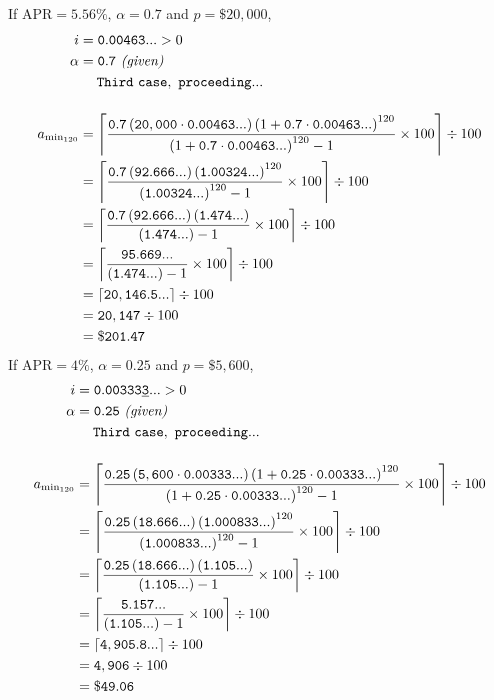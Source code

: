 \documentclass[12pt,letterpaper,oneside]{article}
\theoremstyle{remark} %
\begin{document}
	\newpage
	\renewcommand{\base}{\left(1+\mathtt{0.7}\cdot\mathtt{0.00463...}\right)}
	If $\mbox{APR}=5.56\%$, $\alpha=0.7$ and $p=\$20,000$,
	\begin{align*}
	i&=\mathtt{0.00463...}>0\\
	\alpha&=\mathtt{0.7}\ \textit{(given)}\\
	&\quad\;\mathtt{Third\ case,\ proceeding...}\\[12pt]
	a_{\rm{min_{120}}}&=\left\lceil{\frac{\mathtt{0.7}\left(\mathtt{20,000}\cdot\mathtt{0.00463...}\right)\base^{120}}{\base^{120}-1}\times 100}\right\rceil\div 100\\
	&=\left\lceil{\frac{\mathtt{0.7}\left(\mathtt{92.666...}\right)\left(\mathtt{1.00324...}\right)^{120}}{\left(\mathtt{1.00324...}\right)^{120}-1}\times 100}\right\rceil\div 100\\
	&=\left\lceil{\frac{\mathtt{0.7}\left(\mathtt{92.666...}\right)\left(\mathtt{1.474...}\right)}{\left(\mathtt{1.474...}\right)-1}\times 100}\right\rceil\div 100\\
	&=\left\lceil{\frac{\mathtt{95.669...}}{\left(\mathtt{1.474...}\right)-1}\times 100}\right\rceil\div 100\\
	&=\left\lceil{\mathtt{20,146.5...}}\right\rceil\div 100\\
	&=\mathtt{20,147}\div 100\\
	&=\mathtt{\$201.47}
	\end{align*}
	\renewcommand{\base}{\left(1+\mathtt{0.25}\cdot\mathtt{0.00333...}\right)}
	If $\mbox{APR}=4\%$, $\alpha=0.25$ and $p=\$5,600$,
	\begin{align*}
	i&=\mathtt{0.00333\underline{3}...}>0\\
	\alpha&=\mathtt{0.25}\ \textit{(given)}\\
	&\quad\;\mathtt{Third\ case,\ proceeding...}\\[12pt]
	a_{\rm{min_{120}}}&=\left\lceil{\frac{\mathtt{0.25}\left(\mathtt{5,600}\cdot\mathtt{0.00333...}\right)\base^{120}}{\base^{120}-1}\times 100}\right\rceil\div 100\\
	&=\left\lceil{\frac{\mathtt{0.25}\left(\mathtt{18.666...}\right)\left(\mathtt{1.000833...}\right)^{120}}{\left(\mathtt{1.000833...}\right)^{120}-1}\times 100}\right\rceil\div 100\\
	&=\left\lceil{\frac{\mathtt{0.25}\left(\mathtt{18.666...}\right)\left(\mathtt{1.105...}\right)}{\left(\mathtt{1.105...}\right)-1}\times 100}\right\rceil\div 100\\
	&=\left\lceil{\frac{\mathtt{5.157...}}{\left(\mathtt{1.105...}\right)-1}\times 100}\right\rceil\div 100\\
	&=\left\lceil{\mathtt{4,905.8...}}\right\rceil\div 100\\
	&=\mathtt{4,906}\div 100\\
	&=\mathtt{\$49.06}
	\end{align*}
\end{document}
